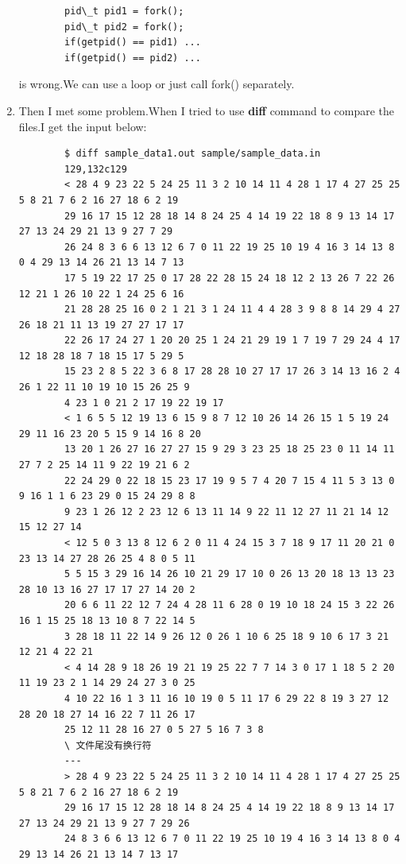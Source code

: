 \documentclass[]{article}
\begin{document}
\begin{enumerate}
    
    \begin{verbatim} 
        pid\_t pid1 = fork();
        pid\_t pid2 = fork();
        if(getpid() == pid1) ...
        if(getpid() == pid2) ...
    \end{verbatim}
    is wrong.We can use a loop or just call fork() separately.
    \item Then I met some problem.When I tried to use \textbf{diff} command to compare the files.I get the input below:
    \begin{verbatim}
        $ diff sample_data1.out sample/sample_data.in
        129,132c129
        < 28 4 9 23 22 5 24 25 11 3 2 10 14 11 4 28 1 17 4 27 25 25 5 8 21 7 6 2 16 27 18 6 2 19 
        29 16 17 15 12 28 18 14 8 24 25 4 14 19 22 18 8 9 13 14 17 27 13 24 29 21 13 9 27 7 29 
        26 24 8 3 6 6 13 12 6 7 0 11 22 19 25 10 19 4 16 3 14 13 8 0 4 29 13 14 26 21 13 14 7 13 
        17 5 19 22 17 25 0 17 28 22 28 15 24 18 12 2 13 26 7 22 26 12 21 1 26 10 22 1 24 25 6 16 
        21 28 28 25 16 0 2 1 21 3 1 24 11 4 4 28 3 9 8 8 14 29 4 27 26 18 21 11 13 19 27 27 17 17 
        22 26 17 24 27 1 20 20 25 1 24 21 29 19 1 7 19 7 29 24 4 17 12 18 28 18 7 18 15 17 5 29 5 
        15 23 2 8 5 22 3 6 8 17 28 28 10 27 17 17 26 3 14 13 16 2 4 26 1 22 11 10 19 10 15 26 25 9 
        4 23 1 0 21 2 17 19 22 19 17 
        < 1 6 5 5 12 19 13 6 15 9 8 7 12 10 26 14 26 15 1 5 19 24 29 11 16 23 20 5 15 9 14 16 8 20 
        13 20 1 26 27 16 27 27 15 9 29 3 23 25 18 25 23 0 11 14 11 27 7 2 25 14 11 9 22 19 21 6 2 
        22 24 29 0 22 18 15 23 17 19 9 5 7 4 20 7 15 4 11 5 3 13 0 9 16 1 1 6 23 29 0 15 24 29 8 8 
        9 23 1 26 12 2 23 12 6 13 11 14 9 22 11 12 27 11 21 14 12 15 12 27 14 
        < 12 5 0 3 13 8 12 6 2 0 11 4 24 15 3 7 18 9 17 11 20 21 0 23 13 14 27 28 26 25 4 8 0 5 11 
        5 5 15 3 29 16 14 26 10 21 29 17 10 0 26 13 20 18 13 13 23 28 10 13 16 27 17 17 27 14 20 2 
        20 6 6 11 22 12 7 24 4 28 11 6 28 0 19 10 18 24 15 3 22 26 16 1 15 25 18 13 10 8 7 22 14 5 
        3 28 18 11 22 14 9 26 12 0 26 1 10 6 25 18 9 10 6 17 3 21 12 21 4 22 21 
        < 4 14 28 9 18 26 19 21 19 25 22 7 7 14 3 0 17 1 18 5 2 20 11 19 23 2 1 14 29 24 27 3 0 25 
        4 10 22 16 1 3 11 16 10 19 0 5 11 17 6 29 22 8 19 3 27 12 28 20 18 27 14 16 22 7 11 26 17 
        25 12 11 28 16 27 0 5 27 5 16 7 3 8
        \ 文件尾没有换行符
        ---
        > 28 4 9 23 22 5 24 25 11 3 2 10 14 11 4 28 1 17 4 27 25 25 5 8 21 7 6 2 16 27 18 6 2 19 
        29 16 17 15 12 28 18 14 8 24 25 4 14 19 22 18 8 9 13 14 17 27 13 24 29 21 13 9 27 7 29 26
        24 8 3 6 6 13 12 6 7 0 11 22 19 25 10 19 4 16 3 14 13 8 0 4 29 13 14 26 21 13 14 7 13 17 

\end{verbatim}
\end{enumerate}
\end{document}
